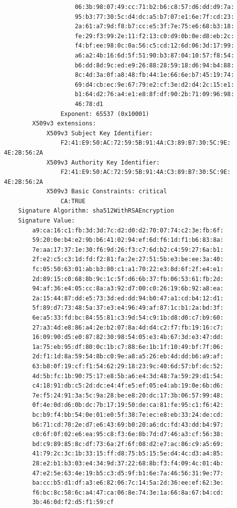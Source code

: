 \begin{verbatim}
                    06:3b:98:07:49:cc:71:b2:b6:c8:57:d6:dd:d9:7a:
                    95:b3:77:30:5c:d4:dc:a5:b7:07:e1:6e:7f:cd:23:
                    2a:61:a7:9d:f8:b7:cc:e5:3f:7e:75:e6:68:b3:18:
                    fe:29:f3:99:2e:11:f2:13:c0:d9:0b:0e:d8:eb:2c:
                    f4:bf:ee:98:0c:0a:56:c5:cd:12:6d:06:3d:17:99:
                    a6:a2:4b:16:6d:5f:51:90:b3:87:04:10:57:f8:54:
                    b6:dd:8d:9c:ed:e9:26:88:28:59:18:d6:94:b4:88:
                    8c:4d:3a:0f:a8:48:fb:44:1e:66:6e:b7:45:19:74:
                    69:d4:cb:ec:9e:67:79:e2:cf:3e:d2:d4:2c:15:e1:
                    b1:64:d2:76:a4:e1:e8:8f:df:90:2b:71:09:96:98:
                    46:78:d1
                Exponent: 65537 (0x10001)
        X509v3 extensions:
            X509v3 Subject Key Identifier:
                F2:41:E9:50:AC:72:59:5B:91:4A:C3:89:B7:30:5C:9E:
4E:2B:56:2A
            X509v3 Authority Key Identifier:
                F2:41:E9:50:AC:72:59:5B:91:4A:C3:89:B7:30:5C:9E:
4E:2B:56:2A
            X509v3 Basic Constraints: critical
                CA:TRUE
    Signature Algorithm: sha512WithRSAEncryption
    Signature Value:
        a9:ca:16:c1:fb:3d:3d:7c:d2:d0:d2:70:07:74:c2:3e:fb:6f:
        59:20:0e:b4:e2:9b:b6:41:02:94:ef:6d:f6:1d:f1:b6:83:8a:
        7e:aa:17:37:1e:30:f6:9d:26:f3:c7:6d:b2:c4:59:27:6a:b1:
        2f:e2:c5:c3:1d:fd:f2:81:fa:2e:27:51:5b:e3:be:ee:3a:40:
        fc:05:50:63:01:ab:b3:80:c1:a1:70:22:e3:8d:6f:2f:e4:e1:
        2d:89:15:c0:68:8b:9c:1c:5f:d6:6b:37:fb:06:53:61:fb:2d:
        94:af:36:e4:05:cc:8a:a3:92:d7:00:c0:26:19:6b:92:a8:ea:
        2a:15:44:87:dd:e5:73:3d:ed:dd:94:b0:47:a1:cd:b4:12:d1:
        5f:89:d7:73:48:5a:37:e3:e4:96:49:af:87:1c:b1:2a:bd:3f:
        6e:a5:33:fd:bc:84:55:81:c3:9d:54:c9:1b:d8:d0:c7:b9:60:
        27:a3:4d:e8:86:a4:2e:b2:07:8a:4d:d4:c2:f7:fb:19:16:c7:
        16:09:90:d5:e0:87:82:30:98:54:05:e3:4b:67:3d:e3:47:dd:
        1a:75:eb:95:df:80:0c:1b:c7:88:6e:1b:1f:10:49:bf:7f:06:
        2d:f1:1d:8a:59:54:8b:c0:9e:a8:a5:26:eb:4d:dd:b6:a9:af:
        63:b8:0f:19:cf:f1:54:62:29:18:23:9c:40:6d:57:bf:dc:52:
        4d:5b:fc:1b:90:75:17:e8:5b:a6:e4:3d:48:7a:59:29:d1:54:
        c4:18:91:db:c5:2d:dc:e4:4f:e5:ef:05:e4:ab:19:0e:6b:d6:
        7e:f5:24:91:3a:5c:9a:28:be:e8:20:dc:17:3b:06:57:99:48:
        0f:4e:0d:d6:0b:dc:7b:17:19:50:de:ca:81:fe:95:c1:f6:42:
        bc:b9:f4:bb:54:0e:01:e0:5f:38:7e:ec:e8:eb:33:24:de:cd:
        b6:71:cd:70:2e:d7:e6:43:69:b0:20:a6:dc:fd:43:dd:b4:97:
        c0:6f:0f:02:e6:ea:95:c8:f3:6e:8b:7d:d7:46:a3:cf:56:38:
        bd:c9:89:85:8c:df:73:6a:2f:6f:08:d2:e7:ac:86:c9:a5:69:
        41:79:2c:3c:1b:33:15:ff:d8:75:b5:15:5e:d4:4c:d3:a4:85:
        28:e2:b1:b3:03:e4:34:9d:37:22:68:8b:f3:f4:09:4c:01:4b:
        47:e2:5e:63:4e:19:b5:c3:d5:9f:b1:6e:7a:46:56:31:9e:77:
        ba:cc:b5:d1:df:a3:e6:82:06:7c:14:5a:2d:36:ee:ef:62:3e:
        f6:bc:8c:58:6c:a4:47:ca:06:8e:74:3e:1a:66:8a:67:b4:cd:
        3b:46:0d:f2:d5:f1:59:cf
\end{verbatim}

